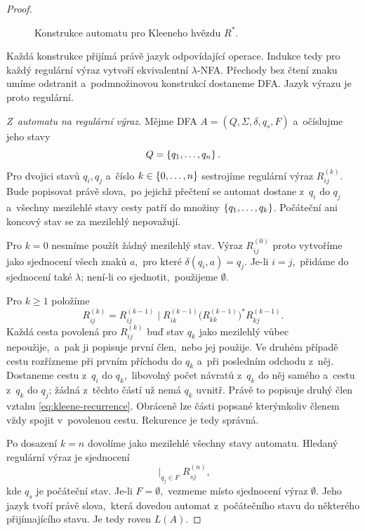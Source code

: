 \begin{proof}
    \begin{figure}[h]
        \centering
        
        \caption{Konstrukce automatu pro Kleeneho hvězdu $R^*$.}
        \label{fig:kleene-star}
    \end{figure}

    Každá konstrukce přijímá právě jazyk odpovídající operace. Indukce tedy pro každý regulární výraz vytvoří ekvivalentní $\lambda$-NFA. Přechody bez čtení znaku umíme odstranit a~podmnožinovou konstrukcí dostaneme DFA. Jazyk výrazu je proto regulární.

    \emph{Z~automatu na regulární výraz.}
    Mějme DFA $A=(Q,\Sigma,\delta,q_s,F)$ a~očíslujme jeho stavy
    \[
        Q=\left\{q_1,\dots,q_n\right\}.
    \]
    Pro dvojici stavů $q_i,q_j$ a~číslo $k\in\left\{0,\dots,n\right\}$ sestrojíme regulární výraz $R_{ij}^{(k)}$. Bude popisovat právě slova,~po jejichž přečtení se automat dostane z~$q_i$ do $q_j$ a~všechny mezilehlé stavy cesty patří do množiny $\left\{q_1,\dots,q_k\right\}$. Počáteční ani koncový stav se za mezilehlý nepovažují.

    Pro $k=0$ nesmíme použít žádný mezilehlý stav. Výraz $R_{ij}^{(0)}$ proto vytvoříme jako sjednocení všech znaků $a$,~pro které $\delta(q_i,a)=q_j$. Je-li $i=j$,~přidáme do sjednocení také $\lambda$; není-li co sjednotit,~použijeme $\emptyset$.

    Pro $k\geqslant1$ položíme
    \begin{equation}
        R_{ij}^{(k)}
        =
        R_{ij}^{(k-1)}
        \mid
        R_{ik}^{(k-1)}
        \bigl(R_{kk}^{(k-1)}\bigr)^*
        R_{kj}^{(k-1)}.
        \label{eq:kleene-recurrence}
    \end{equation}
    Každá cesta povolená pro $R_{ij}^{(k)}$ buď stav $q_k$ jako mezilehlý vůbec nepoužije,~a~pak ji popisuje první člen,~nebo jej použije. Ve druhém případě cestu rozřízneme při prvním příchodu do $q_k$ a~při posledním odchodu z~něj. Dostaneme cestu z~$q_i$ do $q_k$,~libovolný počet návratů z~$q_k$ do něj samého a~cestu z~$q_k$ do $q_j$; žádná z~těchto částí už nemá $q_k$ uvnitř. Právě to popisuje druhý člen vztahu \eqref{eq:kleene-recurrence}. Obráceně lze části popsané kterýmkoliv členem vždy spojit v~povolenou cestu. Rekurence je tedy správná.

    Po dosazení $k=n$ dovolíme jako mezilehlé všechny stavy automatu. Hledaný regulární výraz je sjednocení
    \[
        \mathop{\mid}_{q_j\in F} R_{sj}^{(n)},
    \]
    kde $q_s$ je počáteční stav. Je-li $F=\emptyset$,~vezmeme místo sjednocení výraz $\emptyset$. Jeho jazyk tvoří právě slova,~která dovedou automat z~počátečního stavu do některého přijímajícího stavu. Je tedy roven $L(A)$.
\end{proof}

